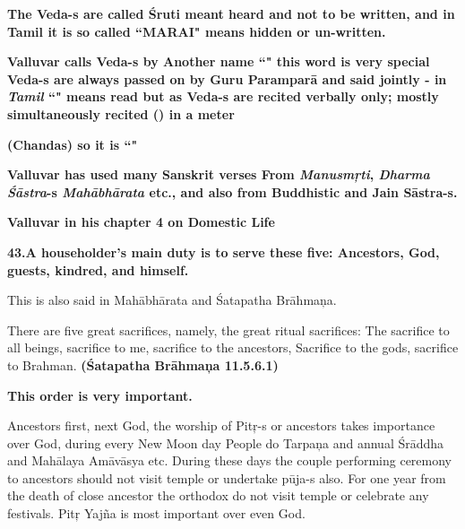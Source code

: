\vskip 2pt

\textbf{The Veda-s are called Śruti meant heard and not to be written, and in Tamil it is so called “MARAI" means hidden or un-written.}

\vskip 2pt

\textbf{Valluvar calls Veda-s by Another name “" this word is very special Veda-s are always passed on by Guru Paramparā and said jointly - in \textit{Tamil} “" means read but as Veda-s are recited verbally only; mostly simultaneously recited () in a meter}

\vskip 2pt

\textbf{(Chandas) so it is “"}

\vskip 2pt

\textbf{Valluvar has used many Sanskrit verses From \textit{Manusmŗti}, \textit{Dharma Śāstra}-s \textit{Mahābhārata} etc., and also from Buddhistic and Jain Sāstra-s.}

\vskip 2pt

\textbf{Valluvar in his chapter 4 on Domestic Life}

\vskip 2pt

\textbf{43.A householder's main duty is to serve these five: Ancestors, God, guests, kindred, and himself.}

\vskip 2pt

This is also said in Mahābhārata and Śatapatha Brāhmaņa.

\vskip 2pt

There are five great sacrifices, namely, the great ritual sacrifices: The sacrifice to all beings, sacrifice to me, sacrifice to the ancestors, Sacrifice to the gods, sacrifice to Brahman. \textbf{(Śatapatha Brāhmaņa 11.5.6.1)}

\vskip 2pt

\textbf{This order is very important.}

\vskip 2pt

Ancestors first, next God, the worship of Pitŗ-s or ancestors takes importance over God, during every New Moon day People do Tarpaņa and annual Śrāddha and Mahālaya Amāvāsya etc. During these days the couple performing ceremony to ancestors should not visit temple or undertake pūja-s also. For one year from the death of close ancestor the orthodox do not visit temple or celebrate any festivals. Pitŗ Yajña is most important over even God.


